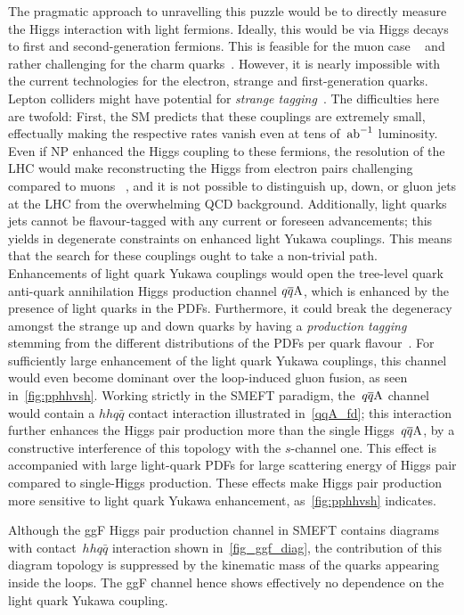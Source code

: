 \par The pragmatic approach to unravelling this puzzle would be to directly measure the Higgs interaction with light fermions. Ideally, this would be via Higgs decays to first and second-generation fermions. This is feasible for the muon case ~\cite{ATLAS:2020fzp,CMS:2020xwi} and rather challenging for the charm quarks~\cite{ATLAS-CONF-2021-021,ATLAS:2022ers,CMS:2019hve}. However, it is  nearly impossible with the current technologies for the electron, strange and first-generation quarks. Lepton colliders might have potential for \emph{strange tagging}~\cite{Nakai:2020kuu}. The difficulties here are twofold: First, the SM predicts that these couplings are extremely small, effectually making the respective rates vanish even at tens of~$\invab$ luminosity. Even if NP enhanced the Higgs coupling to these fermions, the resolution of the LHC would make reconstructing the Higgs from electron pairs challenging compared to muons ~\cite{Khachatryan:2014aep}, and it is not possible to distinguish up, down, or gluon jets at the LHC from the overwhelming QCD background. Additionally, light quarks jets cannot be flavour-tagged with any current or foreseen advancements; this yields in degenerate constraints on enhanced light Yukawa couplings.  This means that the search for these couplings ought to take a non-trivial path. Enhancements of light quark Yukawa couplings would open the tree-level quark anti-quark annihilation Higgs production channel $q\overline q \rm A$, which is enhanced by the presence of light quarks in the PDFs. Furthermore, it could break the degeneracy amongst the strange up and down quarks by having a \emph{production tagging} stemming from the different distributions of the PDFs per quark flavour~\cite{Soreq:2016rae}.  For sufficiently large enhancement of the light quark Yukawa couplings, this channel would even become dominant over the loop-induced gluon fusion, as seen in~\autoref{fig:pphhvsh}. Working strictly in the  SMEFT paradigm, the~$q\overline q \rm A$ channel would contain a $hhq\bar q$ contact interaction illustrated in~\autoref{qqA_fd}; this interaction further enhances the Higgs pair production more than the single Higgs~$q\overline q \rm A$, by a constructive interference of this topology with the $s$-channel one. This effect is accompanied with large light-quark PDFs for large scattering energy of Higgs pair compared to single-Higgs production. These effects  make Higgs pair production more sensitive to light quark Yukawa enhancement, as~\autoref{fig:pphhvsh} indicates.
\par Although the ggF Higgs pair production channel in SMEFT contains diagrams with contact~$hhq\bar q$  interaction shown in~\autoref{fig_ggf_diag}, the contribution of this diagram topology is suppressed by the kinematic mass of the quarks appearing inside the loops. The ggF channel hence shows effectively no dependence on the light quark Yukawa coupling.
